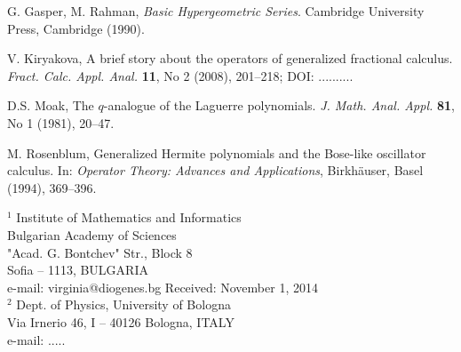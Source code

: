 \documentclass[twoside,reqno,11pt]{fcaa-var} %
\begin{document}

 \begin{thebibliography}{99}
 \normalsize


 G. Gasper, M. Rahman,
 \emph{Basic Hypergeometric Series}.
 Cambridge University Press, Cambridge (1990).


 V. Kiryakova,
 A brief story about the operators of generalized
fractional calculus.
 \emph{Fract. Calc. Appl. Anal.} \textbf{11}, No 2 (2008), 201--218; DOI: ..........


 D.S. Moak,
 The $q$-analogue of the Laguerre polynomials.
\emph{J. Math. Anal. Appl.} \textbf{81}, No 1 (1981), 20--47. %


 M. Rosenblum,
 Generalized Hermite polynomials and the Bose-like oscillator
 calculus.
 In: \emph{Operator Theory: Advances and Applications},
 Birkh\"auser, Basel (1994), 369--396.

\end{thebibliography} %


 \bigskip \smallskip

 \it

 \noindent
$^1$ Institute of Mathematics and Informatics \\
Bulgarian Academy of Sciences \\
"Acad. G. Bontchev" Str., Block 8 \\
Sofia -- 1113, BULGARIA  \\[4pt]
  e-mail: virginia@diogenes.bg
\hfill Received: November 1, 2014 \\[12pt]
$^2$ Dept. of Physics, University of Bologna\\
Via Irnerio 46, I -- 40126 Bologna, ITALY \\[4pt]
  e-mail: .....
\end{document}
